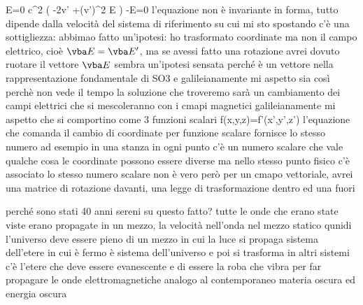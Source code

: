 	\laplacian \vba E=0 \rightarrow {}c^2 \left( -2v\vdot\grad ' +(\vba v\vdot\grad ')^2 \vba E \right) -\laplacian\vba E=0
l'equazione non è invariante in forma, tutto dipende dalla velocità del sistema di riferimento su cui mi sto spostando
c'è una sottigliezza: abbimao fatto un'ipotesi: ho trasformato coordinate ma non il campo elettrico, cioè $\vba E=\vba E'$, ma se avessi fatto una rotazione avrei dovuto ruotare il vettore $\vba E$
sembra un'ipotesi sensata perché è un vettore nella rappresentazione fondamentale di SO3 e galileianamente mi aspetto sia così perchè non vede il tempo
la soluzione che troveremo sarà un cambiamento dei campi elettrici che si mescoleranno con i cmapi magnetici
galileianamente mi aspetto che si comportino come 3 funzioni scalari 
	f(x,y,z)=f'(x',y',z')
l'equazione che comanda il cambio di coordinate per funzione scalare fornisce lo stesso numero
ad esempio in una stanza in ogni punto c'è un numero scalare che vale qualche cosa
le coordinate possono essere diverse ma nello stesso punto fisico c'è associato lo stesso numero scalare
non è vero però per un cmapo vettoriale, avrei una matrice di rotazione davanti, una legge di trasformazione dentro ed una fuori


perché sono stati 40 anni sereni su questo fatto?
tutte le onde che erano state viste erano propagate in un mezzo, la velocità nell'onda nel mezzo statico
qunidi l'universo deve essere pieno di un mezzo in cui la luce si propaga
sistema dell'etere in cui è fermo è sistema dell'universo e poi si trasforma in altri sistemi
c'è l'etere che deve essere evanescente e di essere la roba che vibra per far propagare le onde elettromagnetiche
analogo al contemporaneo materia oscura ed energia oscura

